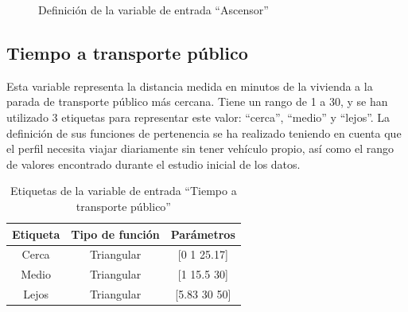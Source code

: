 \documentclass[12pt]{report} %
\begin{document}
        \begin{figure}[H]
            \centering
            \caption{Definición de la variable de entrada ``Ascensor''}
        \end{figure}

        \subsection{Tiempo a transporte público}
        Esta variable representa la distancia medida en minutos de la vivienda a la parada de transporte público más cercana.
        Tiene un rango de 1 a 30, y se han utilizado 3 etiquetas para representar este valor: ``cerca'', ``medio'' y ``lejos''.
        La definición de sus funciones de pertenencia se ha realizado teniendo en cuenta que el perfil necesita viajar 
        diariamente sin tener vehículo propio, así como el rango de valores encontrado durante el estudio inicial de los datos.

        \begin{table}[h]
            \center
            \begin{tabular}{@{}ccc@{}}
                \toprule
                \textbf{Etiqueta} & \textbf{Tipo de función} & \textbf{Parámetros} \\
                \midrule
                Cerca & Triangular & [0 1 25.17]  \\
                Medio & Triangular & [1 15.5 30]  \\
                Lejos & Triangular & [5.83 30 50] \\
                \bottomrule
            \end{tabular}
            \caption{Etiquetas de la variable de entrada ``Tiempo a transporte público''}
        \end{table}
\end{document}
